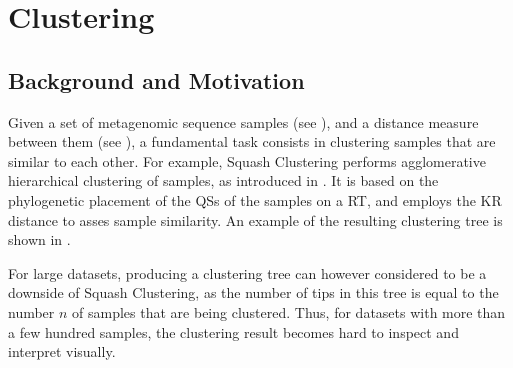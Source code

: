 
\chapter{Clustering}
\label{ch:Clustering}




\section{Background and Motivation}
\label{ch:Clustering:sec:Motivation}

Given a set of metagenomic sequence samples (see ),
and a distance measure between them (see ),
a fundamental task consists in clustering samples that are similar to each other.
For example, Squash Clustering performs agglomerative hierarchical clustering of samples,
as introduced in .
It is based on the phylogenetic placement of the \acfp{QS} of the samples on a \acf{RT},
and employs the KR distance to asses sample similarity.
An example of the resulting clustering tree is shown in .

For large datasets, producing a clustering tree can however considered to be a downside of Squash Clustering,
as the number of tips in this tree is equal to the number $n$ of samples that are being clustered.
Thus, for datasets with more than a few hundred samples,
the clustering result becomes hard to inspect and interpret visually.

